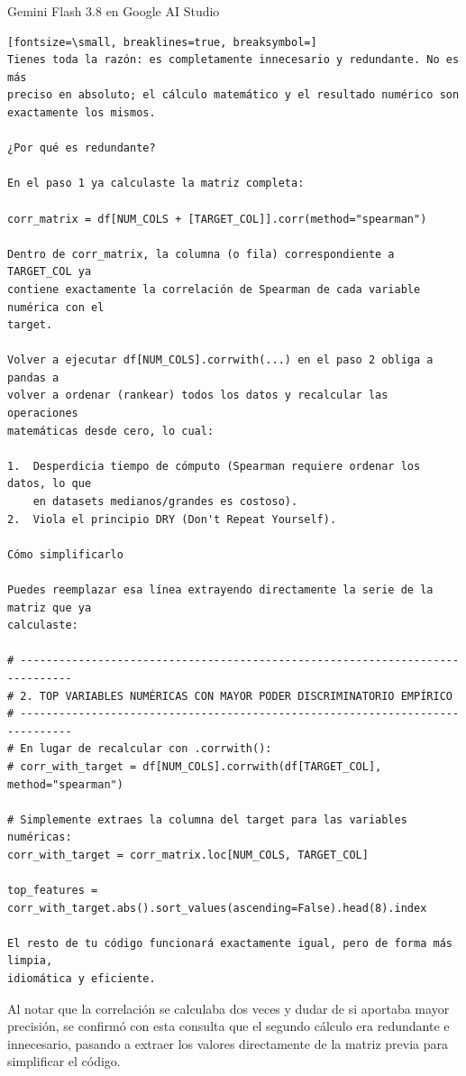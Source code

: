 \documentclass[12pt,a4paper,oneside]{book}
\begin{document}
\begin{iaresp}{Gemini Flash 3.8 en Google AI Studio}
\begin{Verbatim}[fontsize=\small, breaklines=true, breaksymbol=]
Tienes toda la razón: es completamente innecesario y redundante. No es más
preciso en absoluto; el cálculo matemático y el resultado numérico son
exactamente los mismos.

¿Por qué es redundante?

En el paso 1 ya calculaste la matriz completa:

corr_matrix = df[NUM_COLS + [TARGET_COL]].corr(method="spearman")

Dentro de corr_matrix, la columna (o fila) correspondiente a TARGET_COL ya
contiene exactamente la correlación de Spearman de cada variable numérica con el
target.

Volver a ejecutar df[NUM_COLS].corrwith(...) en el paso 2 obliga a pandas a
volver a ordenar (rankear) todos los datos y recalcular las operaciones
matemáticas desde cero, lo cual:

1.  Desperdicia tiempo de cómputo (Spearman requiere ordenar los datos, lo que
    en datasets medianos/grandes es costoso).
2.  Viola el principio DRY (Don't Repeat Yourself).

Cómo simplificarlo

Puedes reemplazar esa línea extrayendo directamente la serie de la matriz que ya
calculaste:

# ------------------------------------------------------------------------------
# 2. TOP VARIABLES NUMÉRICAS CON MAYOR PODER DISCRIMINATORIO EMPÍRICO
# ------------------------------------------------------------------------------
# En lugar de recalcular con .corrwith():
# corr_with_target = df[NUM_COLS].corrwith(df[TARGET_COL], method="spearman")

# Simplemente extraes la columna del target para las variables numéricas:
corr_with_target = corr_matrix.loc[NUM_COLS, TARGET_COL]

top_features = corr_with_target.abs().sort_values(ascending=False).head(8).index

El resto de tu código funcionará exactamente igual, pero de forma más limpia,
idiomática y eficiente.
\end{Verbatim}
\end{iaresp}
\begin{iaanalisis}
Al notar que la correlación se calculaba dos veces y dudar de si aportaba mayor precisión, se confirmó con esta consulta que el segundo cálculo era redundante e innecesario, pasando a extraer los valores directamente de la matriz previa para simplificar el código.
\end{iaanalisis}
\end{document}
